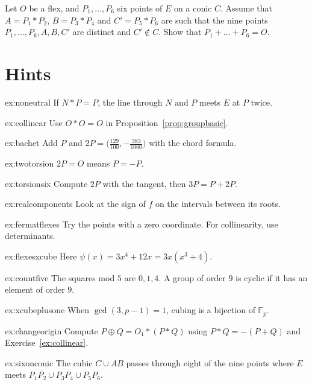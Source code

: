 \begin{exercise}[$\star\star\star$]\label{ex:sixonconic}
Let $O$ be a flex, and $P_1,\dots,P_6$ six points of $E$ on a conic $C$. Assume that $A=P_1*P_2$, $B=P_3*P_4$ and $C'=P_5*P_6$ are such that the nine points $P_1,\dots,P_6,A,B,C'$ are distinct and $C'\notin C$. Show that $P_1+\dots+P_6=O$.
\end{exercise}

\section{Hints}

\begin{hint}{ex:noneutral}
If $N*P=P$, the line through $N$ and $P$ meets $E$ at $P$ twice.
\end{hint}
\begin{hint}{ex:collinear}
Use $O*O=O$ in Proposition~\ref{prop:groupbasic}.
\end{hint}
\begin{hint}{ex:bachet}
Add $P$ and $2P=\bigl(\frac{129}{100},-\frac{383}{1000}\bigr)$ with the chord formula.
\end{hint}
\begin{hint}{ex:twotorsion}
$2P=O$ means $P=-P$.
\end{hint}
\begin{hint}{ex:torsionsix}
Compute $2P$ with the tangent, then $3P=P+2P$.
\end{hint}
\begin{hint}{ex:realcomponents}
Look at the sign of $f$ on the intervals between its roots.
\end{hint}
\begin{hint}{ex:fermatflexes}
Try the points with a zero coordinate. For collinearity, use determinants.
\end{hint}
\begin{hint}{ex:flexesxcube}
Here $\psi(x)=3x^4+12x=3x(x^3+4)$.
\end{hint}
\begin{hint}{ex:countfive}
The squares mod $5$ are $0,1,4$. A group of order $9$ is cyclic if it has an element of order $9$.
\end{hint}
\begin{hint}{ex:xcubeplusone}
When $\gcd(3,p-1)=1$, cubing is a bijection of $\mathbb F_p$.
\end{hint}
\begin{hint}{ex:changeorigin}
Compute $P\oplus Q=O_1*(P*Q)$ using $P*Q=-(P+Q)$ and Exercise~\ref{ex:collinear}.
\end{hint}
\begin{hint}{ex:sixonconic}
The cubic $C\cup AB$ passes through eight of the nine points where $E$ meets $P_1P_2\cup P_3P_4\cup P_5P_6$.
\end{hint}


